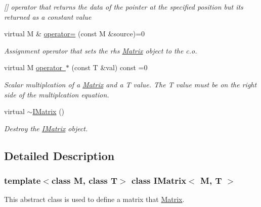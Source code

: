 \begin{DoxyCompactItemize}
\begin{DoxyCompactList}\small\item\em \mbox{[}\mbox{]} operator that returns the data of the pointer at the specified position but its returned as a constant value \end{DoxyCompactList}\item 
virtual M \& \mbox{\hyperlink{class_i_matrix_a9eeb68de7e1d37d1aab439c78fea9be3}{operator=}} (const M \&source)=0
\begin{DoxyCompactList}\small\item\em Assignment operator that sets the rhs \mbox{\hyperlink{class_matrix}{Matrix}} object to the c.\+o. \end{DoxyCompactList}\item 
virtual M \mbox{\hyperlink{class_i_matrix_a10121e038635bdf33552c6a1fb288398}{operator $\ast$}} (const T \&val) const =0
\begin{DoxyCompactList}\small\item\em Scalar multiplcation of a \mbox{\hyperlink{class_matrix}{Matrix}} and a T value. The T value must be on the right side of the multiplcation equation. \end{DoxyCompactList}\item 
virtual \mbox{\hyperlink{class_i_matrix_a72b86d932b115897d81b768343aa5dd3}{$\sim$\+I\+Matrix}} ()
\begin{DoxyCompactList}\small\item\em Destroy the \mbox{\hyperlink{class_i_matrix}{I\+Matrix}} object. \end{DoxyCompactList}\end{DoxyCompactItemize}


\subsection{Detailed Description}
\subsubsection*{template$<$class M, class T$>$\newline
class I\+Matrix$<$ M, T $>$}

This abstract class is used to define a matrix that \mbox{\hyperlink{class_matrix}{Matrix}}. 

